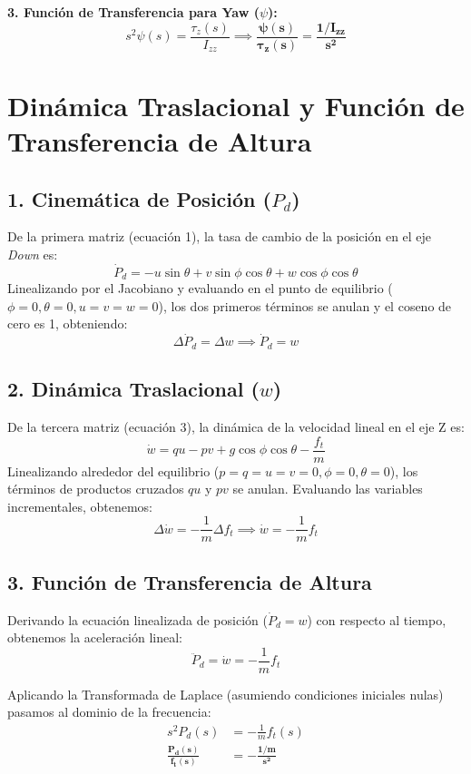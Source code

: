 \documentclass[12pt]{article}
\begin{document}
\textbf{3. Función de Transferencia para Yaw ($\psi$):}
\begin{equation}
    s^2 \psi(s) = \frac{\tau_z(s)}{I_{zz}} \implies \mathbf{\frac{\psi(s)}{\tau_z(s)} = \frac{1/I_{zz}}{s^2}}
\end{equation}

\vspace{0.5cm}

\section{Dinámica Traslacional y Función de Transferencia de Altura}
\subsection{1. Cinemática de Posición ($P_d$)}
De la primera matriz (ecuación 1), la tasa de cambio de la posición en el eje \textit{Down} es:
\begin{equation}
    \dot{P}_d = -u \sin\theta + v \sin\phi \cos\theta + w \cos\phi \cos\theta
\end{equation}
Linealizando por el Jacobiano y evaluando en el punto de equilibrio ($\phi=0, \theta=0, u=v=w=0$), los dos primeros términos se anulan y el coseno de cero es 1, obteniendo:
\begin{equation}
    \Delta\dot{P}_d = \Delta w \implies \dot{P}_d = w
\end{equation}

\subsection{2. Dinámica Traslacional ($w$)}
De la tercera matriz (ecuación 3), la dinámica de la velocidad lineal en el eje Z es:
\begin{equation}
    \dot{w} = qu - pv + g \cos\phi \cos\theta - \frac{f_t}{m}
\end{equation}
Linealizando alrededor del equilibrio ($p=q=u=v=0, \phi=0, \theta=0$), los términos de productos cruzados $qu$ y $pv$ se anulan. Evaluando las variables incrementales, obtenemos:
\begin{equation}
    \Delta\dot{w} = -\frac{1}{m} \Delta f_t \implies \dot{w} = -\frac{1}{m} f_t
\end{equation}

\subsection{3. Función de Transferencia de Altura}
Derivando la ecuación linealizada de posición ($\dot{P}_d = w$) con respecto al tiempo, obtenemos la aceleración lineal:
\begin{equation}
    \ddot{P}_d = \dot{w} = -\frac{1}{m} f_t
\end{equation}

Aplicando la Transformada de Laplace (asumiendo condiciones iniciales nulas) pasamos al dominio de la frecuencia:
\begin{align}
    s^2 P_d(s) &= -\frac{1}{m} f_t(s) \nonumber \\
    \mathbf{\frac{P_d(s)}{f_t(s)}} &\mathbf{= -\frac{1/m}{s^2}}
\end{align}
\end{document}
